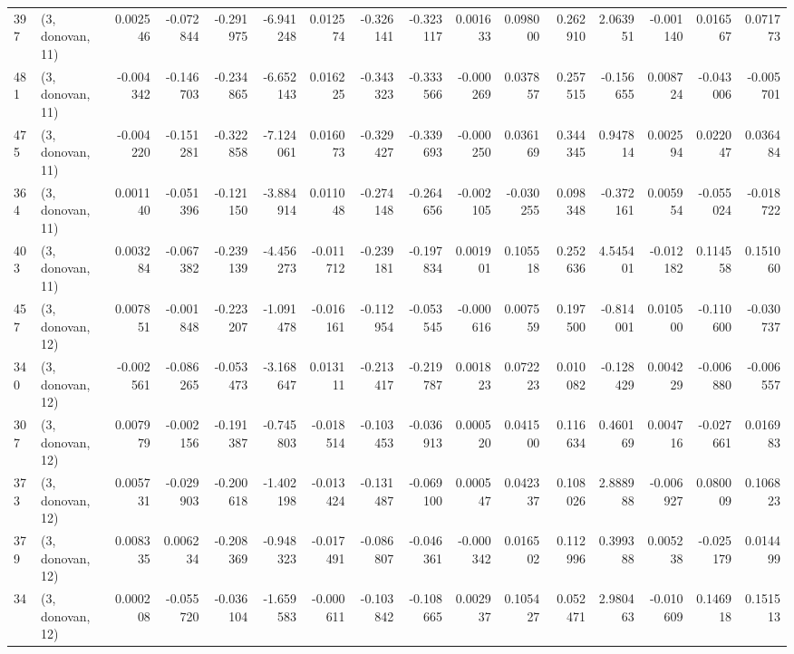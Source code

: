 \begin{tabular}{llrrrrrrrrrrrrrr}
397 &  (3, donovan, 11) &   0.002546 & -0.072844 & -0.291975 &   -6.941248 &  0.012574 &  -0.326141 & -0.323117 &  0.001633 &  0.098000 &  0.262910 &    2.063951 & -0.001140 &  0.016567 &  0.071773 \\
481 &  (3, donovan, 11) &  -0.004342 & -0.146703 & -0.234865 &   -6.652143 &  0.016225 &  -0.343323 & -0.333566 & -0.000269 &  0.037857 &  0.257515 &   -0.156655 &  0.008724 & -0.043006 & -0.005701 \\
475 &  (3, donovan, 11) &  -0.004220 & -0.151281 & -0.322858 &   -7.124061 &  0.016073 &  -0.329427 & -0.339693 & -0.000250 &  0.036169 &  0.344345 &    0.947814 &  0.002594 &  0.022047 &  0.036484 \\
364 &  (3, donovan, 11) &   0.001140 & -0.051396 & -0.121150 &   -3.884914 &  0.011048 &  -0.274148 & -0.264656 & -0.002105 & -0.030255 &  0.098348 &   -0.372161 &  0.005954 & -0.055024 & -0.018722 \\
403 &  (3, donovan, 11) &   0.003284 & -0.067382 & -0.239139 &   -4.456273 & -0.011712 &  -0.239181 & -0.197834 &  0.001901 &  0.105518 &  0.252636 &    4.545401 & -0.012182 &  0.114558 &  0.151060 \\
457 &  (3, donovan, 12) &   0.007851 & -0.001848 & -0.223207 &   -1.091478 & -0.016161 &  -0.112954 & -0.053545 & -0.000616 &  0.007559 &  0.197500 &   -0.814001 &  0.010500 & -0.110600 & -0.030737 \\
340 &  (3, donovan, 12) &  -0.002561 & -0.086265 & -0.053473 &   -3.168647 &  0.013111 &  -0.213417 & -0.219787 &  0.001823 &  0.072223 &  0.010082 &   -0.128429 &  0.004229 & -0.006880 & -0.006557 \\
307 &  (3, donovan, 12) &   0.007979 & -0.002156 & -0.191387 &   -0.745803 & -0.018514 &  -0.103453 & -0.036913 &  0.000520 &  0.041500 &  0.116634 &    0.460169 &  0.004716 & -0.027661 &  0.016983 \\
373 &  (3, donovan, 12) &   0.005731 & -0.029903 & -0.200618 &   -1.402198 & -0.013424 &  -0.131487 & -0.069100 &  0.000547 &  0.042337 &  0.108026 &    2.888988 & -0.006927 &  0.080009 &  0.106823 \\
379 &  (3, donovan, 12) &   0.008335 &  0.006234 & -0.208369 &   -0.948323 & -0.017491 &  -0.086807 & -0.046361 & -0.000342 &  0.016502 &  0.112996 &    0.399388 &  0.005238 & -0.025179 &  0.014499 \\
34  &  (3, donovan, 12) &   0.000208 & -0.055720 & -0.036104 &   -1.659583 & -0.000611 &  -0.103842 & -0.108665 &  0.002937 &  0.105427 &  0.052471 &    2.980463 & -0.010609 &  0.146918 &  0.151513 \\

\end{tabular}
